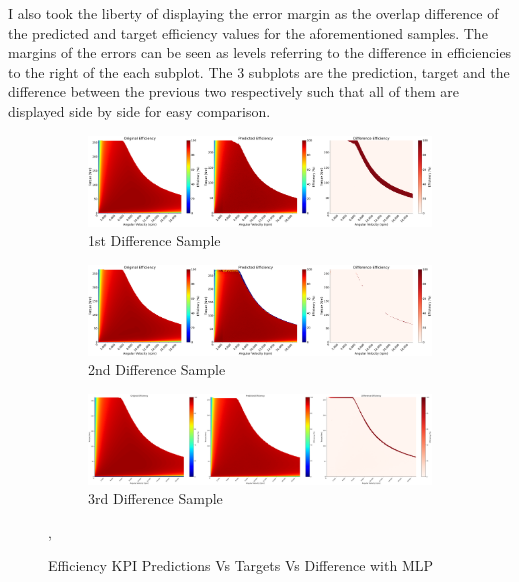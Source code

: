 \documentclass{report} %
\begin{document}
I also took the liberty of displaying the error margin as the overlap difference of the predicted and target efficiency values for the aforementioned samples. 
The margins of the errors can be seen as levels referring to the difference in efficiencies to the right of the each subplot. The 3 subplots are the prediction, target 
and the difference between the previous two respectively such that all of them are displayed side by side for easy comparison. 

\begin{figure}[H]
    \centering
    \begin{subfigure}{1\textwidth}
        \centering
        \includegraphics[width=1\textwidth]{./ReportImages/evalkpi3dprediction1.png} 
        \caption{1st Difference Sample} 
        \label{fig:1st Difference Sample}
    \end{subfigure}\hfill
    \begin{subfigure}{1\textwidth}
        \centering
        \includegraphics[width=1\textwidth]{./ReportImages/evalkpi3dprediction2.png} 
        \caption{2nd Difference Sample} 
        \label{fig:2nd Difference Sample}
    \end{subfigure}\hfill
    \begin{subfigure}{1\textwidth}
        \centering
        \includegraphics[width=1\textwidth]{./ReportImages/evalkpi3dprediction3.png} 
        \caption{3rd Difference Sample} 
        \label{fig:3rd Difference Sample}
    \end{subfigure}
    \caption{Efficiency \ac{KPI} Predictions Vs Targets Vs Difference with \ac{MLP}},
    \label{fig:Efficiency KPI Predictions Vs Targets Vs Difference with MLP}
\end{figure} 
\end{document}
